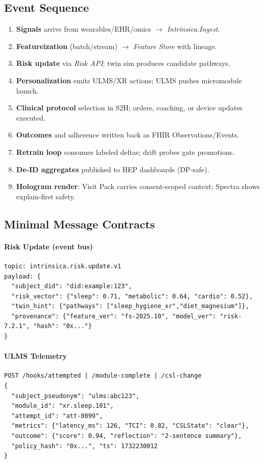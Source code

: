 \documentclass[11pt]{article}
\theoremstyle{plain}
\begin{document}
\subsection{Event Sequence}
\begin{enumerate}
  \item \textbf{Signals} arrive from wearables/EHR/omics $\rightarrow$ \emph{Intrinsica.Ingest}.
  \item \textbf{Featureization} (batch/stream) $\rightarrow$ \emph{Feature Store} with lineage.
  \item \textbf{Risk update} via \emph{Risk API}; twin sim produces candidate pathways.
  \item \textbf{Personalization} emits ULMS/XR actions; ULMS pushes micromodule launch.
  \item \textbf{Clinical protocol} selection in S2H; orders, coaching, or device updates executed.
  \item \textbf{Outcomes} and adherence written back as FHIR Observations/Events.
  \item \textbf{Retrain loop} consumes labeled deltas; drift probes gate promotions.
  \item \textbf{De-ID aggregates} published to HEP dashboards (DP-safe).
  \item \textbf{Hologram render}: Visit Pack carries consent-scoped context; Spectra shows explain-first safety.
\end{enumerate}

\subsection{Minimal Message Contracts}
\paragraph{Risk Update (event bus)}
\begin{verbatim}
topic: intrinsica.risk.update.v1
payload: {
  "subject_did": "did:example:123",
  "risk_vector": {"sleep": 0.71, "metabolic": 0.64, "cardio": 0.52},
  "twin_hint": {"pathways": ["sleep_hygiene_xr","diet_magnesium"]},
  "provenance": {"feature_ver": "fs-2025.10", "model_ver": "risk-7.2.1", "hash": "0x..."}
}
\end{verbatim}

\paragraph{ULMS Telemetry}
\begin{verbatim}
POST /hooks/attempted | /module-complete | /csl-change
{
  "subject_pseudonym": "ulms:abc123",
  "module_id": "xr.sleep.101",
  "attempt_id": "att-0099",
  "metrics": {"latency_ms": 126, "TCI": 0.82, "CSLState": "clear"},
  "outcome": {"score": 0.94, "reflection": "2-sentence summary"},
  "policy_hash": "0x...", "ts": 1732230012
}
\end{verbatim}
\end{document}
